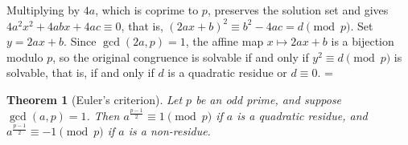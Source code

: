 \documentclass[11pt]{article}
\makeatletter
\theoremstyle{ntstyle}
\newtheorem{theorem}{Theorem}[subsection]
\let\nt@closedisplay\]
\def\nt@guardedclose{\@ifnextchar\par{\nt@closeafterpar}{\@ifnextchar\end{\postdisplaypenalty\@M\nt@closedisplay}{\nt@closedisplay}}}
\def\nt@closeafterpar\par{\@ifnextchar\par{\nt@closeafterpar}{\@ifnextchar\end{\postdisplaypenalty\@M\nt@closedisplay\par}{\nt@closedisplay\par}}}
\renewenvironment{proof}[1][\proofname]{\par
  \pushQED{\qed}\normalfont\topsep\medskipamount\edef\nt@afterproof{\@endparpenalty=\the\@endparpenalty\relax}\@beginparpenalty\@M\@endparpenalty\@M\let\]\nt@guardedclose\trivlist\item[]\textit{#1\@addpunct{.}} \ignorespaces}{\ifvmode\addpenalty\@M\fi\popQED\nt@afterproof\endtrivlist\@endpefalse}
\makeatother
\begin{document}
\begin{proof} Multiplying by $4a$, which is coprime to $p$,
	preserves the solution set and gives $4a^{2}x^{2} + 4abx + 4ac \equiv
		0$, that is, $(2ax + b)^{2} \equiv b^{2} - 4ac = d \pmod{p}$. Set $y =
		2ax + b$. Since $\gcd(2a, p) = 1$, the affine map $x \mapsto 2ax + b$
	is a bijection modulo $p$, so the original congruence is solvable if
	and only if $y^{2} \equiv d \pmod{p}$ is solvable, that is, if and only if
	$d$ is a quadratic residue or $d \equiv 0$.
\end{proof}
\begin{theorem}[Euler's criterion]\label{thm:7.1.2} Let $p$ be an
	odd prime, and suppose $\gcd(a, p) = 1$. Then $a^{\frac{p-1}{2}} \equiv 1
		\pmod{p}$ if $a$ is a quadratic residue, and $a^{\frac{p-1}{2}} \equiv -1 \pmod{p}$ if
	$a$ is a non-residue.
\end{theorem}
\end{document}
